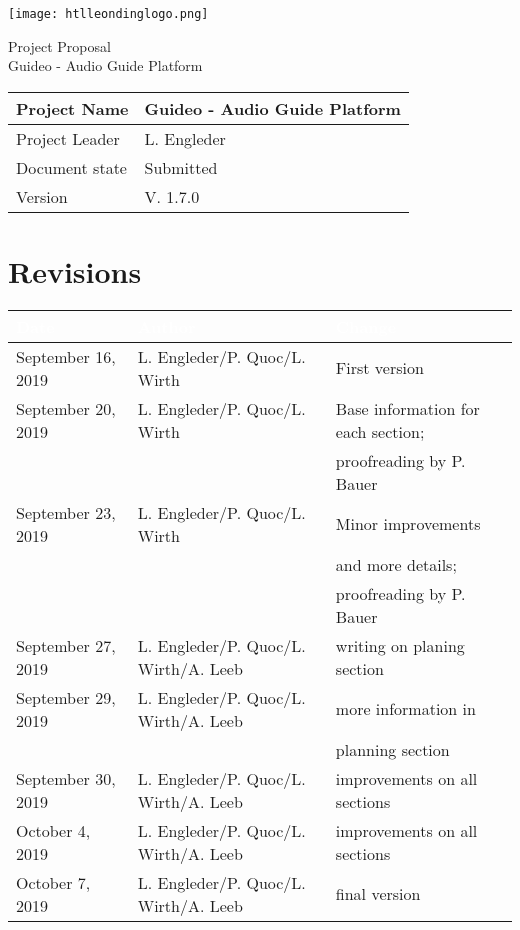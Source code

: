 \documentclass[12pt]{article}
\theoremstyle{definition}
\newcommand{\productname}{Guideo - Audio Guide Platform}
\newcommand{\projectleader}{L. Engleder}
\newcommand{\documentstatus}{Submitted}
\newcommand{\version}{V. 1.7.0}
\begin{document}
\begin{titlepage}
\begin{flushright}
\texttt{[image: htlleondinglogo.png]}\\
\end{flushright}
 
\vspace{10em}
 
\begin{center}
{\Huge Project Proposal} \\[3em]
{\LARGE \productname} \\[3em]
\end{center}
 
\begin{flushleft}
\begin{tabular}{|l|l|}
\hline
Project Name & \productname \\ \hline
Project Leader & \projectleader \\ \hline
Document state & \documentstatus \\ \hline
Version & \version \\ \hline
\end{tabular}
\end{flushleft}
 
\end{titlepage}
\section*{Revisions}
\begin{tabular}{|l|l|l|}
\hline
\cellcolor[gray]{0.5}\textcolor{white}{Date} & \cellcolor[gray]{0.5}\textcolor{white}{Author} & \cellcolor[gray]{0.5}\textcolor{white}{Change} \\ \hline
September 16, 2019&L. Engleder/P. Quoc/L. Wirth&First version \\ \hline
September 20, 2019&L. Engleder/P. Quoc/L. Wirth& Base information for each section; \\ && proofreading by P. Bauer \\ \hline
September 23, 2019&L. Engleder/P. Quoc/L. Wirth&Minor improvements \\ && and more details;  \\ && proofreading by P. Bauer \\ \hline
September 27, 2019&L. Engleder/P. Quoc/L. Wirth/A. Leeb&writing on planing section \\ \hline
September 29, 2019&L. Engleder/P. Quoc/L. Wirth/A. Leeb&more information in \\ && planning section \\ \hline
September 30, 2019&L. Engleder/P. Quoc/L. Wirth/A. Leeb& improvements on all sections \\ \hline
October 4, 2019&L. Engleder/P. Quoc/L. Wirth/A. Leeb&improvements on all sections\\ \hline
October 7, 2019&L. Engleder/P. Quoc/L. Wirth/A. Leeb&final version\\ \hline
\end{tabular}
\pagebreak
 
\end{document}

